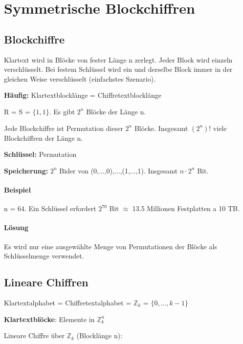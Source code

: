 \chapter{Symmetrische Blockchiffren}

\section{Blockchiffre}

Klartext wird in Blöcke von fester Länge n zerlegt. Jeder Block wird einzeln verschlüsselt. Bei festem Schlüssel wird ein und derselbe Block immer in der gleichen Weise verschlüsselt (einfachstes Szenario). 

\textbf{Häufig:} Klartextblocklänge = Chiffretextblocklänge

\par \medskip

R = S = $\{1, 1\}$. Es gibt $2^n$ Blöcke der Länge n.

Jede Blockchiffre ist Permutation dieser $2^n$ Blöcke. Insgesamt $(2^n)!$ viele Blockchiffren der Länge n.


\textbf{Schlüssel:} Permutation

\textbf{Speicherung:} $2^n$ Bider von (0,...,0),...,(1,...,1). Insgesamt $n \cdot 2^n$ Bit.

\subsubsection{Beispiel}

n = 64. Ein Schlüssel erfordert $2^{70}$ Bit $\approx$ 13.5 Millionen Festplatten a 10 TB.

\subsubsection{Lösung}

Es wird nur eine ausgewählte Menge von Permutationen der Blöcke als Schlüsselmenge verwendet.

\section{Lineare Chiffren}

Klartextalphabet = Chiffretextalphabet = $\mathbb{Z}_k$ = $\{0, ..., k-1\}$

\textbf{Klartextblöcke}: Elemente in $\mathbb{Z}_{k}^n$

Lineare Chiffre über $\mathbb{Z}_k$ (Blocklänge n):

